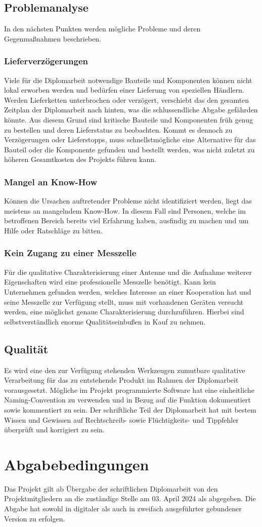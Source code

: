 \subsection{Problemanalyse}
In den nächsten Punkten werden mögliche Probleme und deren Gegenmaßnahmen beschrieben.  

\subsubsection{Lieferverzögerungen}
Viele für die Diplomarbeit notwendige Bauteile und Komponenten können nicht lokal erworben 
werden und bedürfen einer Lieferung von speziellen Händlern. Werden Lieferketten unterbrochen 
oder verzögert, verschiebt das den gesamten Zeitplan der Diplomarbeit nach hinten, was die 
schlussendliche Abgabe gefährden könnte. Aus diesem Grund sind kritische Bauteile und 
Komponenten früh genug zu bestellen und deren Lieferstatus zu beobachten. Kommt es dennoch zu 
Verzögerungen oder Lieferstopps, muss schnellstmögliche eine Alternative für das Bauteil oder die 
Komponente gefunden und bestellt werden, was nicht zuletzt zu höheren Gesamtkosten des Projekts 
führen kann.

\subsubsection{Mangel an Know-How}
Können die Ursachen auftretender Probleme nicht identifiziert werden, liegt das meistens an 
mangelndem Know-How. In diesem Fall sind Personen, welche im betroffenen Bereich bereits viel 
Erfahrung haben, ausfindig zu machen und um Hilfe oder Ratschläge zu bitten. 

\subsubsection{Kein Zugang zu einer Messzelle}
Für die qualitative Charakterisierung einer Antenne und die Aufnahme weiterer Eigenschaften wird eine 
professionelle Messzelle benötigt. Kann kein Unternehmen gefunden werden, welches Interesse an 
einer Kooperation hat und seine Messzelle zur Verfügung stellt, muss mit vorhandenen Geräten 
versucht werden, eine möglichst genaue Charakterisierung durchzuführen. Hierbei sind 
selbstverständlich enorme Qualitätseinbußen in Kauf zu nehmen. 

\subsection{Qualität}
Es wird eine den zur Verfügung stehenden Werkzeugen zumutbare qualitative Verarbeitung für das zu 
entstehende Produkt im Rahmen der Diplomarbeit vorausgesetzt. Mögliche im Projekt programmierte 
Software hat eine einheitliche Naming-Convention zu verwenden und in Bezug auf die Funktion 
dokumentiert sowie kommentiert zu sein. Der schriftliche Teil der Diplomarbeit hat mit bestem Wissen 
und Gewissen auf Rechtschreib- sowie Flüchtigkeits- und Tippfehler überprüft und korrigiert zu sein.

\section{Abgabebedingungen}
Das Projekt gilt ab Übergabe der schriftlichen Diplomarbeit von den Projektmitgliedern an die 
zuständige Stelle am 03. April 2024 als abgegeben. Die Abgabe hat sowohl in digitaler als auch in 
zweifach ausgeführter gebundener Version zu erfolgen. 
\pagebreak
